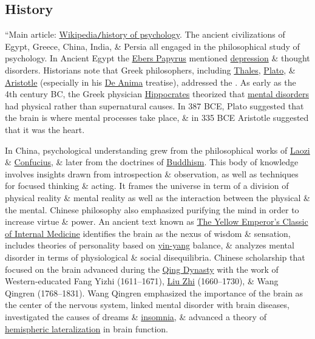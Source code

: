 \documentclass[oneside]{book}
\numberwithin{equation}{section}
\begin{document}
\subsection{History}
``Main article: \href{https://en.wikipedia.org/wiki/History_of_psychology}{Wikipedia\texttt{/}history of psychology}. The ancient civilizations of Egypt, Greece, China, India, \& Persia all engaged in the philosophical study of psychology. In Ancient Egypt the \href{https://en.wikipedia.org/wiki/Ebers_papyrus}{Ebers Papyrus} mentioned \href{https://en.wikipedia.org/wiki/Clinical_depression}{depression} \& thought disorders. Historians note that Greek philosophers, including \href{https://en.wikipedia.org/wiki/Thales}{Thales}, \href{https://en.wikipedia.org/wiki/Plato}{Plato}, \& \href{https://en.wikipedia.org/wiki/Aristotle}{Aristotle} (especially in his \href{https://en.wikipedia.org/wiki/On_the_Soul}{De Anima} treatise), addressed the . As early as the 4th century BC, the Greek physician \href{https://en.wikipedia.org/wiki/Hippocrates}{Hippocrates} theorized that \href{https://en.wikipedia.org/wiki/Mental_disorder}{mental disorders} had physical rather than supernatural causes. In 387 BCE, Plato suggested that the brain is where mental processes take place, \& in 335 BCE Aristotle suggested that it was the heart.

In China, psychological understanding grew from the philosophical works of \href{https://en.wikipedia.org/wiki/Laozi}{Laozi} \& \href{https://en.wikipedia.org/wiki/Confucius}{Confucius}, \& later from the doctrines of \href{https://en.wikipedia.org/wiki/Buddhism}{Buddhism}. This body of knowledge involves insights drawn from introspection \& observation, as well as techniques for focused thinking \& acting. It frames the universe in term of a division of physical reality \& mental reality as well as the interaction between the physical \& the mental. Chinese philosophy also emphasized purifying the mind in order to increase virtue \& power. An ancient text known as \href{https://en.wikipedia.org/wiki/Huangdi_Neijing}{The Yellow Emperor's Classic of Internal Medicine} identifies the brain as the nexus of wisdom \& sensation, includes theories of personality based on \href{https://en.wikipedia.org/wiki/Yin_and_yang}{yin-yang} balance, \& analyzes mental disorder in terms of physiological \& social disequilibria. Chinese scholarship that focused on the brain advanced during the \href{https://en.wikipedia.org/wiki/Qing_Dynasty}{Qing Dynasty} with the work of Western-educated Fang Yizhi (1611--1671), \href{https://en.wikipedia.org/wiki/Liu_Zhi_(scholar)}{Liu Zhi} (1660--1730), \& Wang Qingren (1768--1831). Wang Qingren emphasized the importance of the brain as the center of the nervous system, linked mental disorder with brain diseases, investigated the causes of dreams \& \href{https://en.wikipedia.org/wiki/Insomnia}{insomnia}, \& advanced a theory of \href{https://en.wikipedia.org/wiki/Lateralization_of_brain_function}{hemispheric lateralization} in brain function.
\end{document}
